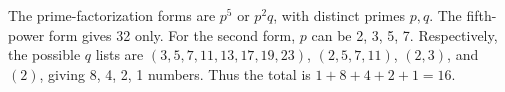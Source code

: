 The prime-factorization forms are $p^5$ or $p^2q$, with distinct primes $p,q$. The fifth-power form gives 32 only. For the second form, $p$ can be 2, 3, 5, 7. Respectively, the possible $q$ lists are $(3,5,7,11,13,17,19,23)$, $(2,5,7,11)$, $(2,3)$, and $(2)$, giving 8, 4, 2, 1 numbers. Thus the total is $1+8+4+2+1=\boxed{16}$.
